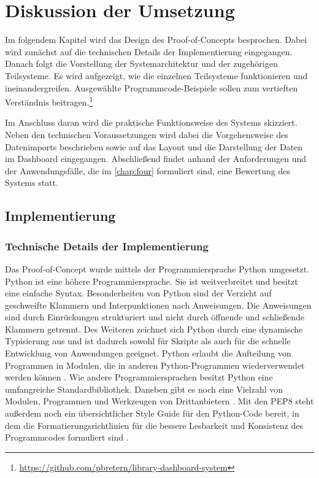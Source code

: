 \chapter{Diskussion der Umsetzung}
\label{chap:five}
Im folgendem Kapitel wird das Design des Proof-of-Concepts besprochen. Dabei wird zunächst auf die technischen Details der
Implementierung eingegangen. Danach folgt die Vorstellung der Systemarchitektur und der zugehörigen Teilsysteme.
Es wird aufgezeigt, wie die einzelnen Teilsysteme funktionieren und ineinandergreifen. Ausgewählte Programmcode-Beispiele sollen zum  
vertieften Verständnis beitragen.\footnote{ \url{https://github.com/pbretern/library-dashboard-system}}

Im Anschluss daran wird die praktische Funktionsweise des Systems skizziert. Neben den technischen Voraussetzungen wird dabei 
die Vorgehensweise des Datenimports beschrieben sowie auf das Layout und die Darstellung der Daten im Dashboard eingegangen. 
Abschließend findet anhand der Anforderungen und der Anwendungsfälle, die im \autoref{chap:four} formuliert sind, eine Bewertung des Systems statt.


\section{Implementierung}
    
    \subsection{Technische Details der Implementierung}
    Das Proof-of-Concept wurde mittels der Programmiersprache Python umgesetzt.
    Python ist eine höhere Programmiersprache. Sie ist weitverbreitet \cite[vgl.][]{loukides_where_2021} und besitzt
    eine einfache Syntax. Besonderheiten von Python sind der Verzicht auf geschweifte Klammern und Interpunktionen nach Anweisungen.
    Die Anweisungen sind durch Einrückungen strukturiert und nicht durch öffnende und schließende Klammern
    getrennt. Des Weiteren zeichnet sich Python durch eine dynamische Typisierung aus und ist dadurch sowohl für Skripte als auch 
    für die schnelle Entwicklung von Anwendungen geeignet. Python erlaubt die Aufteilung von Programmen in Modulen, die in anderen Python-Programmen wiederverwendet werden können
    \cite[vgl.][]{python_6_2021}.
    Wie andere Programmiersprachen besitzt Python eine umfangreiche Standardbibliothek.
    Daneben gibt es noch eine Vielzahl von Modulen, Programmen und Werkzeugen von Drittanbietern \cite[vgl.][]{python_pypi_2021}.
    Mit den \acrfull{PEP8} steht außerdem noch ein übersichtlicher Style Guide für den Python-Code bereit, in dem die Formatierungsrichtlinien für die bessere Lesbarkeit und Konsistenz des Programmcodes formuliert sind \cite[vgl.][]{rossum_pep_2021}.

